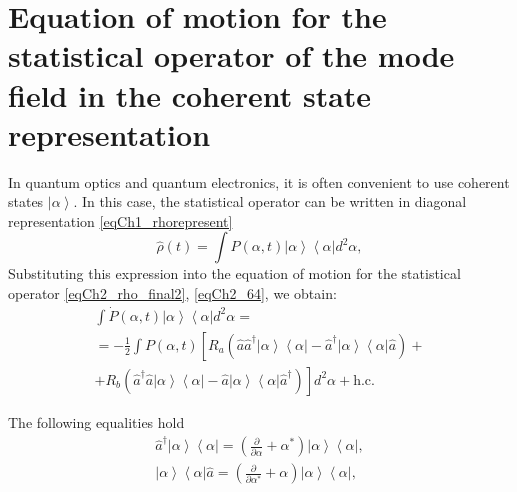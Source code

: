 \section{Equation of motion for the statistical operator of the mode field in
  the coherent state representation}
In quantum optics and quantum electronics, it is often convenient to use
coherent states $\left|\alpha\right>$. In this case,
the statistical operator can be written in diagonal
representation \eqref{eqCh1_rhorepresent}  
\begin{equation}
\hat{\rho}\left(t\right) = \int
P\left(\alpha, t\right)\left|\alpha\right>\left<\alpha\right| d^2 \alpha,
\label{eqCh2_65}
\end{equation}
Substituting this expression into the equation of motion for the statistical
operator \eqref{eqCh2_rho_final2}, \ref{eqCh2_64}, we obtain: 
\begin{eqnarray}
\int \dot{P}\left(\alpha, t\right)\left|\alpha\right>\left<\alpha\right|
d^2 \alpha  = 
\nonumber \\
= -\frac{1}{2}\int P\left(\alpha, t\right)\left[R_a
\left(\hat{a}\hat{a}^{\dag}\left|\alpha\right>\left<\alpha\right|-\hat{a}^{\dag}\left|\alpha\right>\left<\alpha\right|\hat{a}\right)
\right. +
\nonumber \\
+
\left.
R_b
\left(\hat{a}^{\dag}\hat{a}\left|\alpha\right>\left<\alpha\right|-\hat{a}\left|\alpha\right>\left<\alpha\right|\hat{a}^{\dag}\right)
\right]d^2 \alpha +\mbox{h.c.}
\label{eqCh2_66}
\end{eqnarray}

The following equalities hold
\begin{eqnarray}
\hat{a}^{\dag}\left|\alpha\right>\left<\alpha\right| = 
\left(\frac{\partial}{\partial \alpha} +
\alpha^{*}\right)\left|\alpha\right>\left<\alpha\right|, 
\nonumber \\
\left|\alpha\right>\left<\alpha\right|\hat{a} = 
\left(\frac{\partial}{\partial \alpha^{*}} +
\alpha\right)\left|\alpha\right>\left<\alpha\right|, 
\label{eqCh2_67}
\end{eqnarray}

